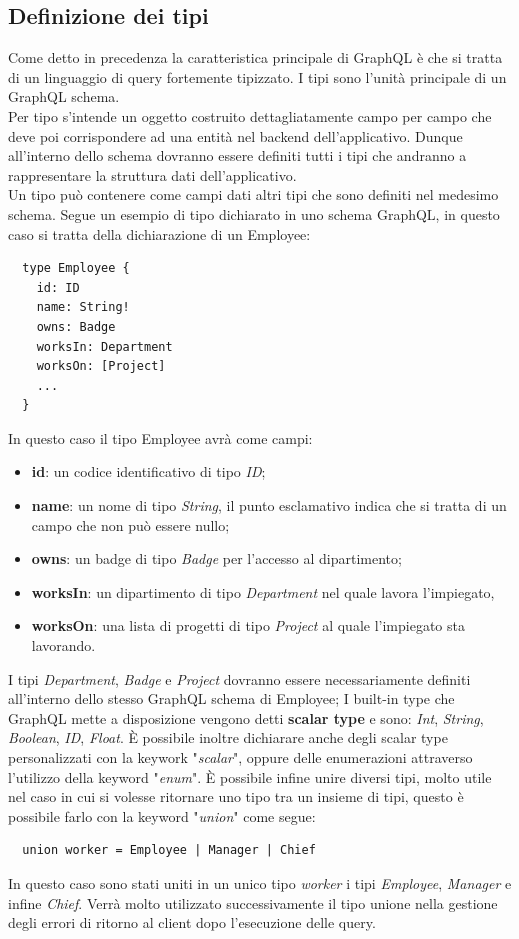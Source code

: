 \subsection*{Definizione dei tipi}
Come detto in precedenza la caratteristica principale di GraphQL è che si tratta di un linguaggio di query fortemente tipizzato. I tipi sono l'unità principale di un GraphQL schema.\\
Per tipo s'intende un oggetto costruito dettagliatamente campo per campo che deve poi corrispondere ad una entità nel backend dell'applicativo. Dunque all'interno dello schema dovranno essere definiti tutti i tipi che andranno a rappresentare la struttura dati dell'applicativo.\\
Un tipo può contenere come campi dati altri tipi che sono definiti nel medesimo schema. Segue un esempio di tipo dichiarato in uno schema GraphQL, in questo caso si tratta della dichiarazione di un Employee:
\begin{verbatim}
  type Employee {
    id: ID
    name: String!
    owns: Badge
    worksIn: Department
    worksOn: [Project]
    ...
  }
\end{verbatim}
In questo caso il tipo Employee avrà come campi:
\begin{itemize}
  \item \textbf{id}: un codice identificativo di tipo \textit{ID};
  \item \textbf{name}: un nome di tipo \textit{String}, il punto esclamativo indica che si tratta di un campo che non può essere nullo;
  \item \textbf{owns}: un badge di tipo \textit{Badge} per l'accesso al dipartimento;
  \item \textbf{worksIn}: un dipartimento di tipo \textit{Department} nel quale lavora l'impiegato,
  \item \textbf{worksOn}: una lista di progetti di tipo \textit{Project} al quale l'impiegato sta lavorando.
\end{itemize}
I tipi \textit{Department}, \textit{Badge} e \textit{Project} dovranno essere necessariamente definiti all'interno dello stesso GraphQL schema di Employee;
I built-in type che GraphQL mette a disposizione vengono detti \textbf{scalar type} e sono: \textit{Int}, \textit{String}, \textit{Boolean}, \textit{ID}, \textit{Float}.
È possibile inoltre dichiarare anche degli scalar type personalizzati con la keywork "\textit{scalar}", oppure delle enumerazioni attraverso l'utilizzo della keyword "\textit{enum}". È possibile infine unire diversi tipi, molto utile nel caso in cui si volesse ritornare uno tipo tra un insieme di tipi, questo è possibile farlo con la keyword "\textit{union}" come segue:
\begin{verbatim}
  union worker = Employee | Manager | Chief
\end{verbatim}
In questo caso sono stati uniti in un unico tipo \textit{worker} i tipi \textit{Employee}, \textit{Manager} e infine \textit{Chief}. Verrà molto utilizzato successivamente il tipo unione nella gestione degli errori di ritorno al client dopo l'esecuzione delle query.
